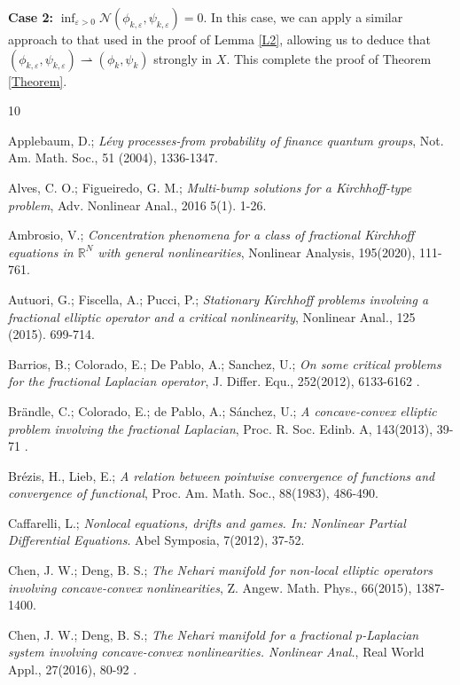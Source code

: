 \documentclass[reqno]{amsart}
\begin{document}
\noindent\textbf{Case 2:} 
$\inf_{\varepsilon>0} \mathcal{N}(\phi_{k,\varepsilon},\psi_{k,\varepsilon})=0$. 
In this case, we can apply a similar approach to that used in the proof of 
Lemma \ref{L2}, allowing us to deduce that 
$(\phi_{k,\varepsilon},\psi_{k,\varepsilon})\rightharpoonup (\phi_k,\psi_k)$ 
strongly in $X$. This complete the proof of Theorem \ref{Theorem}.

\begin{thebibliography}{10}

 Applebaum, D.; 
\emph{L\'evy processes-from probability of finance quantum groups}, 
Not. Am. Math. Soc., 51 (2004), 1336-1347.

 Alves, C. O.;  Figueiredo, G. M.;
\emph{Multi-bump solutions for a Kirchhoff-type problem}, 
Adv. Nonlinear Anal., 2016 5(1). 1-26.

 Ambrosio, V.;
\emph{Concentration phenomena for a class of fractional Kirchhoff equations 
in $\mathbb{R}^N$ with general nonlinearities}, Nonlinear Analysis, 195(2020), 111-761.

 Autuori, G.;  Fiscella, A.;  Pucci, P.;
\emph{Stationary  Kirchhoff  problems  involving  a  fractional  elliptic operator 
and a critical nonlinearity}, Nonlinear Anal., 125 (2015). 699-714.

 Barrios, B.; Colorado, E.; De Pablo, A.; Sanchez, U.;
\emph{On some critical problems for the fractional Laplacian operator}, 
J. Differ. Equ., 252(2012), 6133-6162 .

 Br\"andle, C.; Colorado, E.; de Pablo, A.; S\'anchez, U.;
\emph{A concave-convex elliptic problem involving the fractional Laplacian}, 
Proc. R. Soc. Edinb. A, 143(2013), 39-71 .

  Br\'ezis, H., Lieb, E.;
\emph{A relation between pointwise convergence of functions and convergence of 
functional}, Proc. Am. Math. Soc., 88(1983), 486-490.

 Caffarelli, L.;
\emph{Nonlocal equations, drifts and games. In: Nonlinear Partial Differential Equations}.
 Abel Symposia, 7(2012), 37-52.

 Chen, J. W.; Deng, B. S.;
\emph{The Nehari manifold for non-local elliptic operators involving concave-convex 
nonlinearities}, Z. Angew. Math. Phys., 66(2015), 1387-1400.

 Chen, J. W.; Deng, B. S.;
\emph{The Nehari manifold for a fractional $p$-Laplacian system involving concave-convex 
nonlinearities. Nonlinear Anal.}, Real World Appl., 27(2016), 80-92 .


\end{thebibliography}
\end{document}

